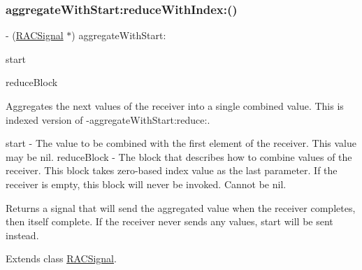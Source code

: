 \mbox{\label{category_r_a_c_signal_07_operations_08_a83c6fc367091505aa6721f1c6a58d65d}} 
\subsubsection{\texorpdfstring{aggregate\+With\+Start\+:reduce\+With\+Index\+:()}{aggregateWithStart:reduceWithIndex:()}\hspace{0.1cm}{\footnotesize\ttfamily [3/3]}}
{\footnotesize\ttfamily -\/ (\mbox{\hyperlink{interface_r_a_c_signal}{R\+A\+C\+Signal}} $\ast$) aggregate\+With\+Start\+: \begin{DoxyParamCaption}\item[{(id)}]{start }\item[{reduceWithIndex:(id($^\wedge$)(id running, id next, N\+S\+U\+Integer index))}]{reduce\+Block }\end{DoxyParamCaption}}

Aggregates the {\ttfamily next} values of the receiver into a single combined value. This is indexed version of -\/aggregate\+With\+Start\+:reduce\+:.

start -\/ The value to be combined with the first element of the receiver. This value may be {\ttfamily nil}. reduce\+Block -\/ The block that describes how to combine values of the receiver. This block takes zero-\/based index value as the last parameter. If the receiver is empty, this block will never be invoked. Cannot be nil.

Returns a signal that will send the aggregated value when the receiver completes, then itself complete. If the receiver never sends any values, {\ttfamily start} will be sent instead. 

Extends class \mbox{\hyperlink{interface_r_a_c_signal_a83c6fc367091505aa6721f1c6a58d65d}{R\+A\+C\+Signal}}.

\mbox{\label{category_r_a_c_signal_07_operations_08_a51c08c7a357f83c96c468a6aa13d4d87}} 
